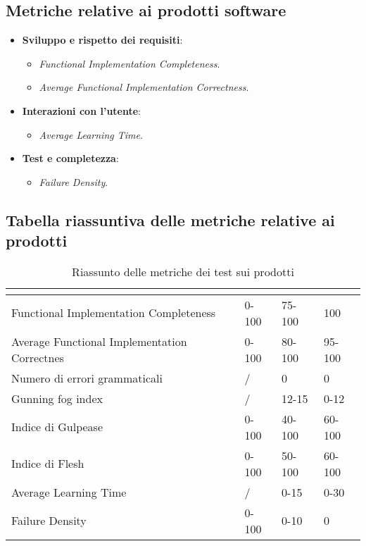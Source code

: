 \subsection{Metriche relative ai prodotti software}

\begin{itemize}
	\item{\textbf{Sviluppo e rispetto dei requisiti}:
		\begin{itemize}
			\item{\emph{Functional Implementation Completeness}.}
			\item{\emph{Average Functional Implementation Correctness}.}			
		\end{itemize}	
	}
	\item{\textbf{Interazioni con l'utente}: 
		\begin{itemize}
			\item{\emph{Average Learning Time}.}
		\end{itemize}	
	}
	\item{\textbf{Test e completezza}: 
	\begin{itemize}
		\item{\emph{Failure Density}.}
	\end{itemize}	
}
\end{itemize}

\subsection{Tabella riassuntiva delle metriche relative ai prodotti}
\renewcommand{\arraystretch}{1.5}
\begin{table}[H]
	\centering
	\begin{tabular}{|C{4cm}|C{3cm}|C{3cm}|C{3cm}|}
		\hline
		\textbf{\color{title_text}{Nome Metrica}} & \textbf{\color{title_text}{Intervallo limite}} & \textbf{\color{title_text}{Range accettabile}} & \textbf{\color{title_text}{Range ottimale}} \\ \hline
		Functional Implementation Completeness & 0-100 & 75-100 & 100 \\ \hline
		Average Functional Implementation Correctnes&0-100&80-100&95-100 \\ \hline
		Numero di errori grammaticali & / & 0 & 0 \\ \hline
		Gunning fog index & / &12-15&0-12 \\ \hline
		Indice di Gulpease & 0-100& 40-100& 60-100 \\ \hline
		Indice di Flesh& 0-100 & 50-100& 60-100\\ \hline
		Average Learning Time& / &0-15 & 0-30 \\ \hline
		Failure Density&0-100&0-10&0\\ \hline
	\end{tabular}
	\caption{Riassunto delle metriche dei test sui prodotti}
	\label{tabella:riassunto metriche dei test sui prodotti}
\end{table}
\renewcommand{\arraystretch}{1}
\pagebreak